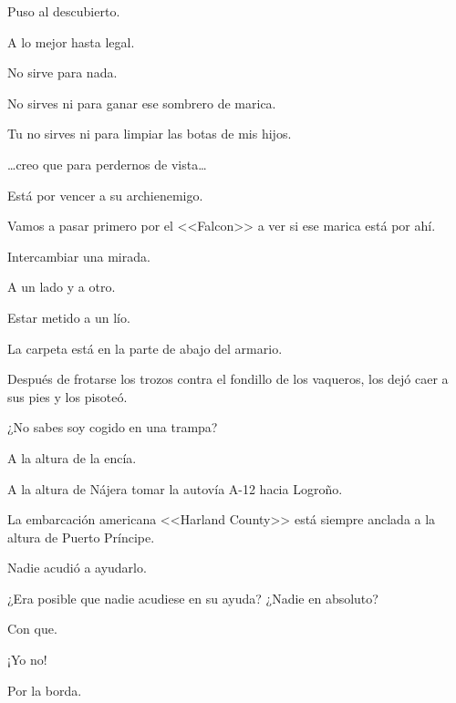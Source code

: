 \sk
Puso al descubierto. 

\sk
A lo mejor hasta legal. 

\sk
No sirve para nada. 

\sk
No sirves ni para ganar ese sombrero de marica. \nb{}

\sk
Tu no sirves ni para limpiar las botas de mis hijos. 

\sk
\ldots{}creo que para perdernos de vista\ldots{} 

\sk
Está por vencer a su archienemigo. 

\sk
Vamos a pasar primero por el <<Falcon>> a ver si ese marica está por ahí. \nb{}

\sk
Intercambiar una mirada. 

\sk
A un lado y a otro. 

\sk
Estar metido a un lío. 

\sk
La carpeta está en la parte de abajo del armario. \nb{}

\sk
Después de frotarse los trozos contra el fondillo de los vaqueros, los dejó caer a sus pies y los pisoteó. 

\sk
¿No sabes soy cogido en una trampa? 

\sk
A la altura de la encía. 

\sk
A la altura de Nájera tomar la autovía A-12 hacia Logroño. 

\sk
La embarcación americana <<Harland County>> está siempre anclada a la altura de Puerto Príncipe. 

\sk
Nadie acudió a ayudarlo. 

\sk
¿Era posible que nadie acudiese en su ayuda? ¿Nadie en absoluto? 

\sk
Con que. 

\sk
¡Yo no! 

\sk
Por la borda. 

